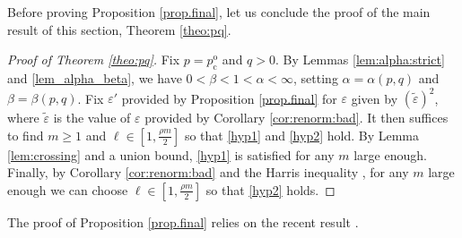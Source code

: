 \documentclass[pdflatex,sn-mathphys-num]{sn-jnl}%
\newcommand{\1}{{\ensuremath{\mathbf{1}}} }
\newcommand{\pco}{\ensuremath{p_{\mathrm{c}}^{\mathrm{o}} }}
\theoremstyle{thmstyleone}%
\theoremstyle{thmstyletwo}%
\theoremstyle{thmstylethree}%
\begin{document}
Before proving Proposition \ref{prop.final}, let us conclude the proof of the main result of this section, Theorem \ref{theo:pq}.
\begin{proof}[Proof of Theorem \ref{theo:pq}]
Fix $p=\pco$ and $q>0$. By Lemmas \ref{lem:alpha:strict} and \ref{lem_alpha_beta}, we have $0<\beta<1<\alpha<\infty$, setting $\alpha=\alpha(p,q)$ and $\beta=\beta(p,q)$. Fix $\varepsilon'$ provided by Proposition \ref{prop.final} for $\varepsilon$ given by $(\tilde \varepsilon)^2$, where $\tilde \varepsilon$ is the value of $\varepsilon$ provided by Corollary \ref{cor:renorm:bad}. It then suffices to find $m\ge 1$ and $\ell\in[1,\tfrac{\rho m}{2}]$ so that \eqref{hyp1} and \eqref{hyp2} hold. By Lemma \ref{lem:crossing} and a union bound, \eqref{hyp1} is satisfied for any $m$ large enough. Finally, by Corollary \ref{cor:renorm:bad} and the Harris inequality \cite{Harris60}, for any $m$ large enough we can choose $\ell\in[1,\tfrac{\rho m}{2}]$ so that \eqref{hyp2} holds.
\end{proof}
The proof of Proposition \ref{prop.final} relies on the 
recent result \cite[Theorem 8.2]{Hilario23}.
\end{document}
